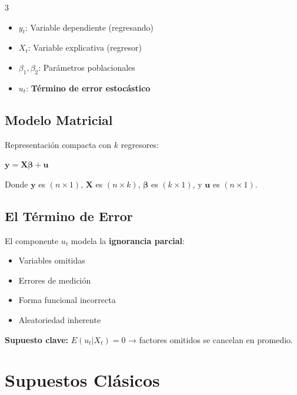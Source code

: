 \documentclass[9pt, spanish, twoside]{article}
\newcommand{\critical}[1]{\textcolor{CriticalRed}{\textbf{#1}}}
\newcommand{\eqbox}[1]{\colorbox{TitaniumGray}{$\displaystyle #1$}}
\begin{document}
\begin{multicols*}{3}
\begin{itemize}[leftmargin=8pt, noitemsep, topsep=2pt]
    \item $y_t$: Variable dependiente (regresando)
    \item $X_t$: Variable explicativa (regresor)
    \item $\beta_1, \beta_2$: Parámetros poblacionales
    \item $u_t$: \critical{Término de error estocástico}
\end{itemize}

\subsection{Modelo Matricial}
Representación compacta con $k$ regresores:

\vspace{2pt}
\eqbox{\mathbf{y} = \mathbf{X}\boldsymbol{\beta} + \mathbf{u}}
\vspace{2pt}

Donde $\mathbf{y}$ es $(n \times 1)$, $\mathbf{X}$ es $(n \times k)$, $\boldsymbol{\beta}$ es $(k \times 1)$, y $\mathbf{u}$ es $(n \times 1)$.

\subsection{El Término de Error}
El componente $u_t$ modela la \textbf{ignorancia parcial}:
\begin{itemize}[leftmargin=8pt, noitemsep, topsep=2pt]
    \item Variables omitidas
    \item Errores de medición
    \item Forma funcional incorrecta
    \item Aleatoriedad inherente
\end{itemize}

\critical{Supuesto clave:} $E(u_t|X_t) = 0$ → factores omitidos se cancelan en promedio.



\section{Supuestos Clásicos}

\end{multicols*}
\end{document}
